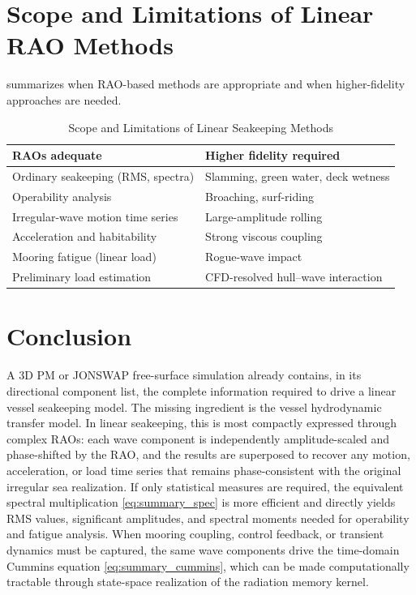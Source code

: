 \documentclass[journal,10pt,twocolumn]{IEEEtran}
\begin{document}
    \section{Scope and Limitations of Linear RAO Methods}
    \label{sec:limits}

     summarizes when RAO-based methods are appropriate and when
    higher-fidelity approaches are needed.

    \begin{table}[t]
        \centering
        \caption{Scope and Limitations of Linear Seakeeping Methods}
        \label{tab:scope}
        \small
        \begin{tabular}{@{}L{2.1cm}L{2.5cm}@{}}
            \toprule
            RAOs adequate & Higher fidelity required \\
            \midrule
            Ordinary seakeeping (RMS, spectra) &
            Slamming, green water, deck wetness \\
            Operability analysis &
            Broaching, surf-riding \\
            Irregular-wave motion time series &
            Large-amplitude rolling \\
            Acceleration and habitability &
            Strong viscous coupling \\
            Mooring fatigue (linear load) &
            Rogue-wave impact \\
            Preliminary load estimation &
            CFD-resolved hull--wave interaction \\
            \bottomrule
        \end{tabular}
    \end{table}

    \section{Conclusion}
    \label{sec:conclusion}

    A 3D PM or JONSWAP free-surface simulation already contains, in its directional
    component list, the complete information required to drive a linear vessel seakeeping
    model.
    The missing ingredient is the vessel hydrodynamic transfer model.
    In linear seakeeping, this is most compactly expressed through complex RAOs: each
    wave component is independently amplitude-scaled and phase-shifted by the RAO, and the
    results are superposed to recover any motion, acceleration, or load time series that
    remains phase-consistent with the original irregular sea realization.
    If only statistical measures are required, the equivalent spectral multiplication
    \eqref{eq:summary_spec} is more efficient and directly yields RMS values, significant
    amplitudes, and spectral moments needed for operability and fatigue analysis.
    When mooring coupling, control feedback, or transient dynamics must be captured, the
    same wave components drive the time-domain Cummins equation \eqref{eq:summary_cummins},
    which can be made computationally tractable through state-space realization of the
    radiation memory kernel.
\end{document}
